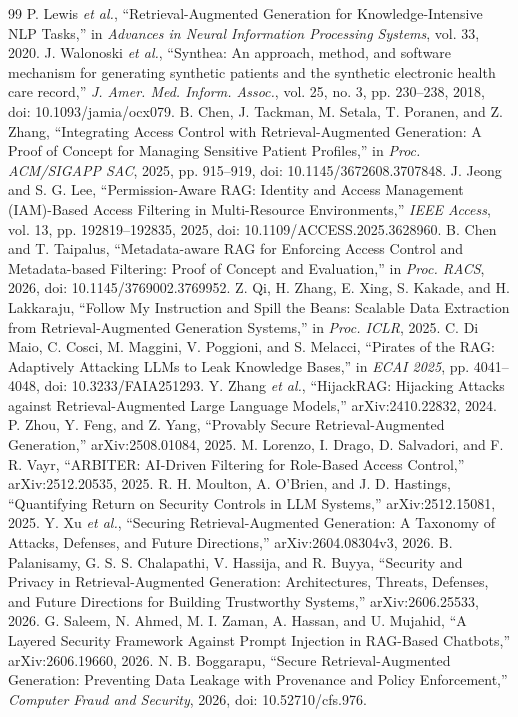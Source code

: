 \begin{thebibliography}{99}
 P. Lewis \emph{et al.}, ``Retrieval-Augmented Generation for Knowledge-Intensive NLP Tasks,'' in \emph{Advances in Neural Information Processing Systems}, vol. 33, 2020.
 J. Walonoski \emph{et al.}, ``Synthea: An approach, method, and software mechanism for generating synthetic patients and the synthetic electronic health care record,'' \emph{J. Amer. Med. Inform. Assoc.}, vol. 25, no. 3, pp. 230--238, 2018, doi: 10.1093/jamia/ocx079.
 B. Chen, J. Tackman, M. Setala, T. Poranen, and Z. Zhang, ``Integrating Access Control with Retrieval-Augmented Generation: A Proof of Concept for Managing Sensitive Patient Profiles,'' in \emph{Proc. ACM/SIGAPP SAC}, 2025, pp. 915--919, doi: 10.1145/3672608.3707848.
 J. Jeong and S. G. Lee, ``Permission-Aware RAG: Identity and Access Management (IAM)-Based Access Filtering in Multi-Resource Environments,'' \emph{IEEE Access}, vol. 13, pp. 192819--192835, 2025, doi: 10.1109/ACCESS.2025.3628960.
 B. Chen and T. Taipalus, ``Metadata-aware RAG for Enforcing Access Control and Metadata-based Filtering: Proof of Concept and Evaluation,'' in \emph{Proc. RACS}, 2026, doi: 10.1145/3769002.3769952.
 Z. Qi, H. Zhang, E. Xing, S. Kakade, and H. Lakkaraju, ``Follow My Instruction and Spill the Beans: Scalable Data Extraction from Retrieval-Augmented Generation Systems,'' in \emph{Proc. ICLR}, 2025.
 C. Di Maio, C. Cosci, M. Maggini, V. Poggioni, and S. Melacci, ``Pirates of the RAG: Adaptively Attacking LLMs to Leak Knowledge Bases,'' in \emph{ECAI 2025}, pp. 4041--4048, doi: 10.3233/FAIA251293.
 Y. Zhang \emph{et al.}, ``HijackRAG: Hijacking Attacks against Retrieval-Augmented Large Language Models,'' arXiv:2410.22832, 2024.
 P. Zhou, Y. Feng, and Z. Yang, ``Provably Secure Retrieval-Augmented Generation,'' arXiv:2508.01084, 2025.
 M. Lorenzo, I. Drago, D. Salvadori, and F. R. Vayr, ``ARBITER: AI-Driven Filtering for Role-Based Access Control,'' arXiv:2512.20535, 2025.
 R. H. Moulton, A. O'Brien, and J. D. Hastings, ``Quantifying Return on Security Controls in LLM Systems,'' arXiv:2512.15081, 2025.
 Y. Xu \emph{et al.}, ``Securing Retrieval-Augmented Generation: A Taxonomy of Attacks, Defenses, and Future Directions,'' arXiv:2604.08304v3, 2026.
 B. Palanisamy, G. S. S. Chalapathi, V. Hassija, and R. Buyya, ``Security and Privacy in Retrieval-Augmented Generation: Architectures, Threats, Defenses, and Future Directions for Building Trustworthy Systems,'' arXiv:2606.25533, 2026.
 G. Saleem, N. Ahmed, M. I. Zaman, A. Hassan, and U. Mujahid, ``A Layered Security Framework Against Prompt Injection in RAG-Based Chatbots,'' arXiv:2606.19660, 2026.
 N. B. Boggarapu, ``Secure Retrieval-Augmented Generation: Preventing Data Leakage with Provenance and Policy Enforcement,'' \emph{Computer Fraud and Security}, 2026, doi: 10.52710/cfs.976.
\end{thebibliography}
